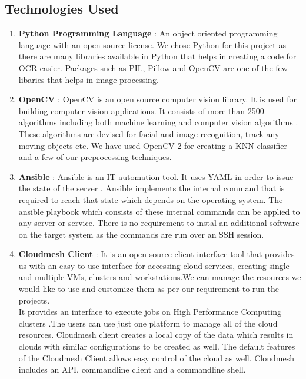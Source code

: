 \documentclass[9pt,twocolumn,twoside]{../../styles/osajnl}
\begin{document}
\subsection{Technologies Used}
\begin{enumerate}
  \item {\bfseries Python Programming Language} : An object oriented
  programming language with an open-source license. We chose Python for
  this project as there are many libraries available in Python that
  helps in creating a code for OCR easier. Packages such as PIL,
  Pillow and OpenCV are one of the few libaries that helps in image
  processing.
\item{\bfseries OpenCV } : OpenCV is an open source computer vision
  library.  It is used for building computer vision applications. It
  consists of more than 2500 algorithms including both machine
  learning and computer vision algorithms \cite{opencv-about}. These algorithms are
  devised for facial and image recognition, track any moving objects
  etc. We have used OpenCV 2 for creating a KNN classifier and a few
  of our preprocessing techniques.
  
  \item{\bfseries Ansible} : Ansible is an IT automation tool. It uses
    YAML in order to issue the state of the server
    \cite{www-ocr}. Ansible implements the internal command that is
    required to reach that state which depends on the operating
    system. The ansible playbook which consists of these internal
    commands can be applied to any server or service. There is no
    requirement to instal an additional software on the target system
    as the commands are run over an SSH session.
  \item{\bfseries Cloudmesh Client} : It is an open source client
    interface tool that provides us with an easy-to-use interface for
    accessing cloud services, creating single and multiple VMs, 
    clusters and workstations.We can manage the resources we would
    like to use and customize them as per our requirement to run the
    projects.\\ It provides an interface to execute jobs on High
    Performance Computing clusters \cite{cloudmesh}.The users can use
    just one platform to manage all of the cloud resources. Cloudmesh
    client creates a local copy of the data which results in clouds
    with similar configurations to be created as well.  The default
    features of the Cloudmesh Client allows easy control of the cloud
    as well. Cloudmesh includes an API, commandline client and a
    commandline shell.


\end{enumerate}
\end{document}
